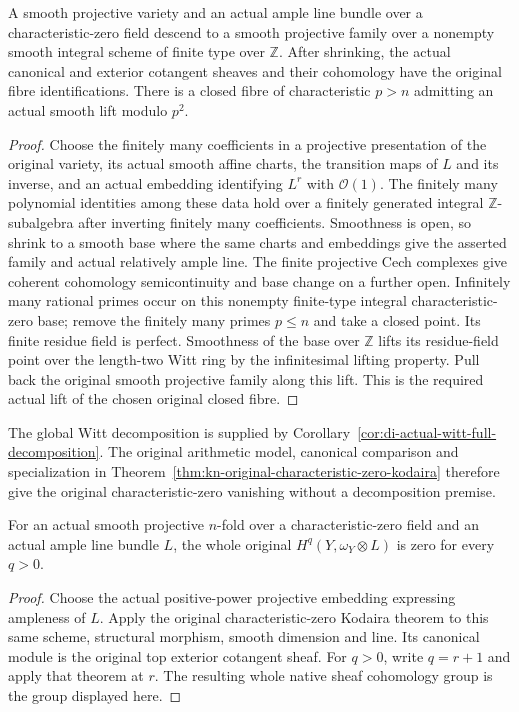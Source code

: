 \begin{lemma}
\label{lem:vanishing-original-spreading}
\notready
A smooth projective variety and an actual ample line bundle over a
characteristic-zero field descend to a smooth projective family over a
nonempty smooth integral scheme of finite type over $\mathbb Z$. After
shrinking, the actual canonical and exterior cotangent sheaves and their
cohomology have the original fibre identifications. There is a closed
fibre of characteristic $p>n$ admitting an actual smooth lift modulo
$p^2$.
\end{lemma}
\begin{proof}
Choose the finitely many coefficients in a projective presentation of the
original variety, its actual smooth affine charts, the transition maps
of $L$ and its inverse, and an actual embedding identifying $L^r$ with
$\mathcal O(1)$. The finitely many polynomial identities among these data
hold over a finitely generated integral $\mathbb Z$-subalgebra after
inverting finitely many coefficients. Smoothness is open, so shrink to a
smooth base where the same charts and embeddings give the asserted
family and actual relatively ample line. The finite projective Cech
complexes give coherent cohomology semicontinuity and base change on a
further open. Infinitely many rational primes occur on this nonempty
finite-type integral characteristic-zero base; remove the finitely many
primes $p\le n$ and take a closed point. Its finite residue field is
perfect. Smoothness of the base over $\mathbb Z$ lifts its residue-field
point over the length-two Witt ring by the infinitesimal lifting property.
Pull back the original smooth projective family along this lift. This is
the required actual lift of the chosen original closed fibre.
\end{proof}

The global Witt decomposition is supplied by
Corollary~\ref{cor:di-actual-witt-full-decomposition}. The original arithmetic
model, canonical comparison and specialization in
Theorem~\ref{thm:kn-original-characteristic-zero-kodaira} therefore give
the original characteristic-zero vanishing without a decomposition premise.

\begin{theorem}
\label{thm:vanishing-original-kodaira}
\leanok
For an actual smooth projective $n$-fold over a characteristic-zero field
and an actual ample line bundle $L$, the whole original
$H^q(Y,\omega_Y\otimes L)$ is zero for every $q>0$.
\end{theorem}
\begin{proof}
Choose the actual positive-power projective embedding expressing
ampleness of $L$. Apply the original characteristic-zero Kodaira theorem
to this same scheme, structural morphism, smooth dimension and line.
Its canonical module is the original top exterior cotangent sheaf.
For $q>0$, write $q=r+1$ and apply that theorem at $r$. The resulting
whole native sheaf cohomology group is the group displayed here.
\end{proof}
